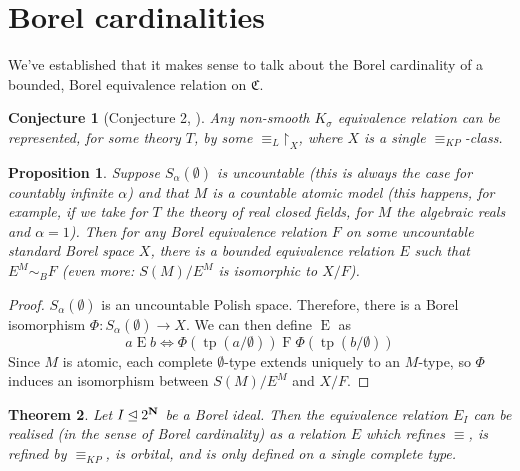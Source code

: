 \documentclass[final,a4paper,12pt]{amsart}
\newtheorem{thm}{Theorem}[section]
\newtheorem{prop}[thm]{Proposition}
\newtheorem{con}{Conjecture}
\theoremstyle{remark}
\theoremstyle{definition}
\DeclareMathOperator{\tp}{{tp}}
\newcommand{\mon}{\mathfrak C}
\newcommand{\restr}{\mathord{\upharpoonright}}
\newcommand{\Laseq}{\mathrel{\equiv_L}}
\newcommand{\KPeq}{\mathrel{\equiv_{KP}}}
\let\Phi\varPhi
\begin{document}
	
	\address{
		Instytut Matematyczny, Uniwersytet Wrocławski,
		pl. Grunwaldzki 2/4, 50-384 Wrocław, Poland
	}
	
	
	
	\author{Tomasz Rzepecki}
	
	
	
	\section{Borel cardinalities}
	We've established that it makes sense to talk about the Borel cardinality of a bounded, Borel equivalence relation on $\mon$.
	
	\begin{con}[Conjecture 2, \autocite{KPS13}]
		Any non-smooth $K_\sigma$ equivalence relation can be represented, for some theory $T$, by some $\Laseq\restr_X$, where $X$ is a single $\KPeq$-class.
	\end{con}
	
	\begin{prop}
		Suppose $S_\alpha(\emptyset)$ is uncountable (this is always the case for countably infinite $\alpha$) and that $M$ is a countable atomic model (this happens, for example, if we take for $T$ the theory of real closed fields, for $M$ the algebraic reals and $\alpha=1$). Then for any Borel equivalence relation $F$ on some uncountable standard Borel space $X$, there is a bounded equivalence relation $E$ such that $E^M\sim_B F$ (even more: $S(M)/E^M$ is isomorphic to $X/F$).
	\end{prop}
	\begin{proof}
		$S_\alpha(\emptyset)$ is an uncountable Polish space. Therefore, there is a Borel isomorphism $\Phi\colon S_\alpha(\emptyset)\to X$. We can then define $\mathrel{E}$ as 
		\[
		a\mathrel{E}b\iff \Phi(\tp(a/\emptyset)) \mathrel{F} \Phi(\tp(b/\emptyset))
		\]
		Since $M$ is atomic, each complete $\emptyset$-type extends uniquely to an $M$-type, so $\Phi$ induces an isomorphism between $S(M)/E^M$ and $X/F$.
	\end{proof}
	
	\begin{thm}
		Let $I\unlhd 2^{\bf N}$ be a Borel ideal. Then the equivalence relation $E_I$ can be realised (in the sense of Borel cardinality) as a relation $E$ which refines $\equiv$, is refined by $\KPeq$, is orbital, and is only defined on a single complete type.
	\end{thm}
	
\end{document}
